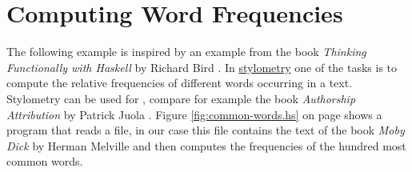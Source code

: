 \section{Computing Word Frequencies}
The following example is inspired by an example from the book
\emph{Thinking Functionally with Haskell} by Richard Bird \cite{bird:2014}.
In \href{https://en.wikipedia.org/wiki/stylometry}{stylometry} one of the tasks is to compute the
relative frequencies of different words occurring in a text.  Stylometry can be used for
, compare for example the book \emph{Authorship Attribution} by Patrick
Juola \cite{juola:2008}.  Figure \ref{fig:common-words.hs} on page \pageref{fig:common-words.hs}
shows a program that reads a file, in our case this file contains the text of the book \emph{Moby Dick}
by Herman Melville \cite{melville:1851} and then computes the frequencies of the hundred most common words.

